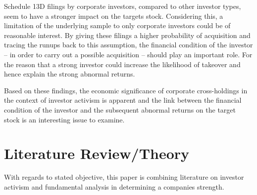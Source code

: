 \documentclass[12pt]{article}
\begin{document}
Schedule 13D filings by corporate investors, compared to other investor types, seem to have a stronger impact on the targets stock. Considering this, a limitation of the underlying sample to only corporate investors could be of reasonable interest. 
By giving these filings a higher probability of acquisition and tracing the runups back to this assumption, the financial condition of the investor -- in order to carry out a possible acquisition -- should play an important role. For the reason that a strong investor could increase the likelihood of takeover and hence explain the strong abnormal returns.
 
Based on these findings, the economic significance of corporate cross-holdings in the context of investor activism is apparent and the link between the financial condition of the investor and the subsequent abnormal returns on the target stock is an interesting issue to examine. 

\section{Literature Review/Theory}

With regards to stated objective, this paper is combining literature on investor activism and fundamental analysis in determining a companies strength.
\end{document}
